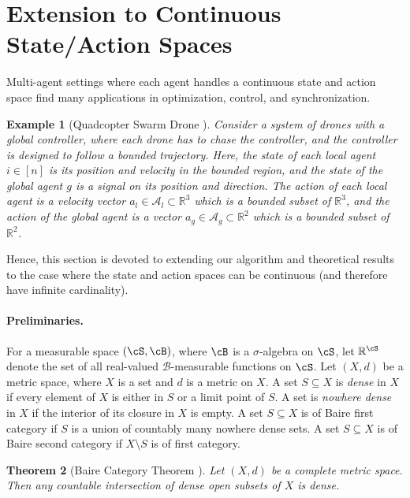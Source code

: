 \documentclass{article}
\newcommand\R{\mathbb{R}}
\theoremstyle{plain}
\newtheorem{theorem}{Theorem}[section]
\newtheorem{example}[theorem]{Example}
\theoremstyle{definition}
\begin{document}
\section{Extension to Continuous State/Action Spaces}
\label{Appendix/extension_nontabular}
Multi-agent settings where each agent handles a continuous state and action space find many applications in optimization, control, and synchronization.

\begin{example}[Quadcopter Swarm Drone \citep{7989376}] Consider a system of drones with a global controller, where each drone has to chase the controller, and the controller is designed to follow a bounded trajectory. Here, the state of each local agent $i\in[n]$ is its position and velocity in the bounded region, and the state of the global agent $g$ is a signal on its position and direction. The action of each local agent is a velocity vector $a_l\in \mathcal{A}_l\subset \R^3$ which is a bounded subset of $\R^3$, and the action of the global agent is a vector $a_g\in \mathcal{A}_g\subset \R^2$ which is a bounded subset of $\R^2$. 
\end{example}

Hence, this section is devoted to extending our algorithm and theoretical results to the case where the state and action spaces can be continuous (and therefore have infinite cardinality).

\paragraph{Preliminaries.} For a measurable space $(\cS,\cB)$, where $\cB$  is a $\sigma$-algebra on $\cS$, let $\R^\cS$ denote the set of all real-valued $\mathcal{B}$-measurable functions on $\cS$. Let $(X,d)$ be a metric space, where $X$ is a set and $d$ is a metric on $X$. A set $S\subseteq X$ is \emph{dense} in $X$ if every element of $X$ is either in $S$ or a limit point of $S$. A set is \emph{nowhere dense} in $X$ if the interior of its closure in $X$ is empty.
    A set $S\subseteq X$ is of Baire first category if $S$ is a union of countably many nowhere dense sets. A set $S\subseteq X$ is of Baire second category if $X\setminus S$ is of first category.

\begin{theorem}[Baire Category Theorem \citep{pmlr-v125-jin20a}] \emph{Let $(X,d)$ be a complete metric space. Then any countable intersection of dense open subsets of $X$ is dense.}
\end{theorem}
\end{document}
